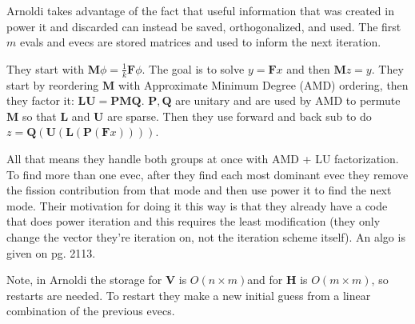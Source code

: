 \documentclass[12pt,twoside]{book}
\newcommand{\ve}[1]{\ensuremath{\mathbf{#1}}}
\begin{document}
\begin{enumerate}
  Arnoldi takes advantage of the fact that useful information that was created in power it and discarded can instead be saved, orthogonalized, and used. The first $m$ evals and evecs are stored matrices and used to inform the next iteration.

  They start with $\ve{M}\phi = \frac{1}{k}\ve{F}\phi$. The goal is to solve $y = \ve{F}x$ and then $\ve{M}z = y$. They start by reordering $\ve{M}$ with Approximate Minimum Degree (AMD) ordering, then they factor it: $\ve{LU} = \ve{PMQ}$. $\ve{P}, \ve{Q}$ are unitary and are used by AMD to permute $\ve{M}$ so that $\ve{L}$ and $\ve{U}$ are sparse. Then they use forward and back sub to do $z = \ve{Q}(\ve{U}(\ve{L}(\ve{P}(\ve{F}x))))$.

  All that means they handle both groups at once with AMD + LU factorization. To find more than one evec, after they find each most dominant evec they remove the fission contribution from that mode and then use power it to find the next mode. Their motivation for doing it this way is that they already have a code that does power iteration and this requires the least modification (they only change the vector they're iteration on, not the iteration scheme itself). An algo is given on pg. 2113.

  Note, in Arnoldi the storage for $\ve{V}$ is $O(n \times m)$and for $\ve{H}$ is $O(m \times m)$, so restarts are needed. To restart they make a new initial guess from a linear combination of the previous evecs.



\end{enumerate}
\end{document}
